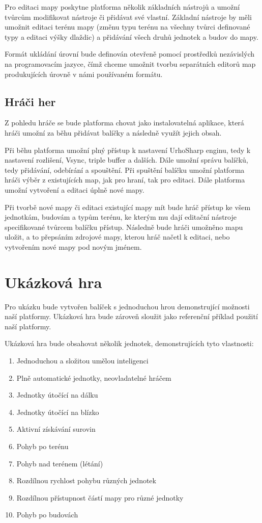 Pro editaci mapy poskytne platforma několik základních nástrojů a umožní tvůrcům modifikovat nástroje či přidávat své vlastní. Základní nástroje by měli umožnit editaci terénu mapy (změnu typu terénu na všechny tvůrci definované typy a editaci výšky dlaždic) a přidávání všech druhů jednotek a budov do mapy.

Formát ukládání úrovní bude definován otevřeně pomocí prostředků nezávislých na programovacím jazyce, čímž chceme umožnit tvorbu separátních editorů map produkujících úrovně v námi používaném formátu.

\subsection{Hráči her}
Z pohledu hráče se bude platforma chovat jako instalovatelná aplikace, která hráči umožní za běhu přidávat balíčky a následně využít jejich obsah.

Při běhu platforma umožní plný přístup k nastavení UrhoSharp enginu, tedy k nastavení rozlišení, Vsync, triple buffer a dalších. Dále umožní správu balíčků, tedy přidávání, odebírání a spouštění. Při spuštění balíčku umožní platforma hráči výběr z existujících map, jak pro hraní, tak pro editaci. Dále platforma umožní vytvoření a editaci úplně nové mapy.

Při tvorbě nové mapy či editaci existující mapy mít bude hráč přístup ke všem jednotkám, budovám a typům terénu, ke kterým mu dají editační nástroje specifikované tvůrcem balíčku přístup. Následně bude hráči umožněno mapu uložit, a to přepsáním zdrojové mapy, kterou hráč načetl k editaci, nebo vytvořením nové mapy pod novým jménem.

\section{Ukázková hra}
\label{sec:showcasedef}

Pro ukázku bude vytvořen balíček s jednoduchou hrou demonstrující možnosti naší platformy. Ukázková hra bude zároveň sloužit jako referenční příklad použití naší platformy.

Ukázková hra bude obsahovat několik jednotek, demonstrujících tyto vlastnosti:
\begin{enumerate}
	\item Jednoduchou a složitou umělou inteligenci
	\item Plně automatické jednotky, neovladatelné hráčem
	\item Jednotky útočící na dálku
	\item Jednotky útočící na blízko
	\item Aktivní získávání surovin
	\item Pohyb po terénu
	\item Pohyb nad terénem (létání)
	\item Rozdílnou rychlost pohybu různých jednotek
	\item Rozdílnou přístupnost částí mapy pro různé jednotky
	\item Pohyb po budovách
\end{enumerate}

